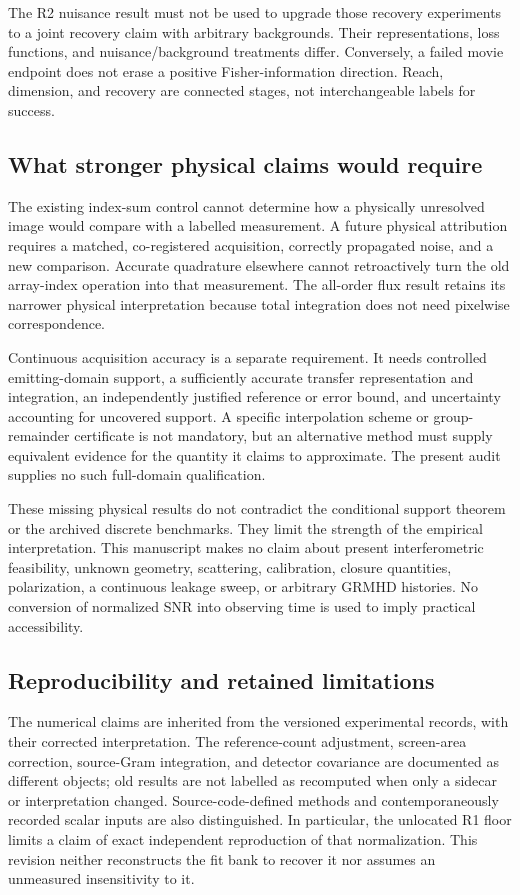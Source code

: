 The R2 nuisance result must not be used to upgrade those recovery experiments to a joint recovery claim with arbitrary backgrounds. Their representations, loss functions, and nuisance/background treatments differ. Conversely, a failed movie endpoint does not erase a positive Fisher-information direction. Reach, dimension, and recovery are connected stages, not interchangeable labels for success.

\subsection{What stronger physical claims would require}
The existing index-sum control cannot determine how a physically unresolved image would compare with a labelled measurement. A future physical attribution requires a matched, co-registered acquisition, correctly propagated noise, and a new comparison. Accurate quadrature elsewhere cannot retroactively turn the old array-index operation into that measurement. The all-order flux result retains its narrower physical interpretation because total integration does not need pixelwise correspondence.

Continuous acquisition accuracy is a separate requirement. It needs controlled emitting-domain support, a sufficiently accurate transfer representation and integration, an independently justified reference or error bound, and uncertainty accounting for uncovered support. A specific interpolation scheme or group-remainder certificate is not mandatory, but an alternative method must supply equivalent evidence for the quantity it claims to approximate. The present audit supplies no such full-domain qualification.

These missing physical results do not contradict the conditional support theorem or the archived discrete benchmarks. They limit the strength of the empirical interpretation. This manuscript makes no claim about present interferometric feasibility, unknown geometry, scattering, calibration, closure quantities, polarization, a continuous leakage sweep, or arbitrary GRMHD histories. No conversion of normalized SNR into observing time is used to imply practical accessibility.

\subsection{Reproducibility and retained limitations}
The numerical claims are inherited from the versioned experimental records, with their corrected interpretation. The reference-count adjustment, screen-area correction, source-Gram integration, and detector covariance are documented as different objects; old results are not labelled as recomputed when only a sidecar or interpretation changed. Source-code-defined methods and contemporaneously recorded scalar inputs are also distinguished. In particular, the unlocated R1 floor limits a claim of exact independent reproduction of that normalization. This revision neither reconstructs the fit bank to recover it nor assumes an unmeasured insensitivity to it.

